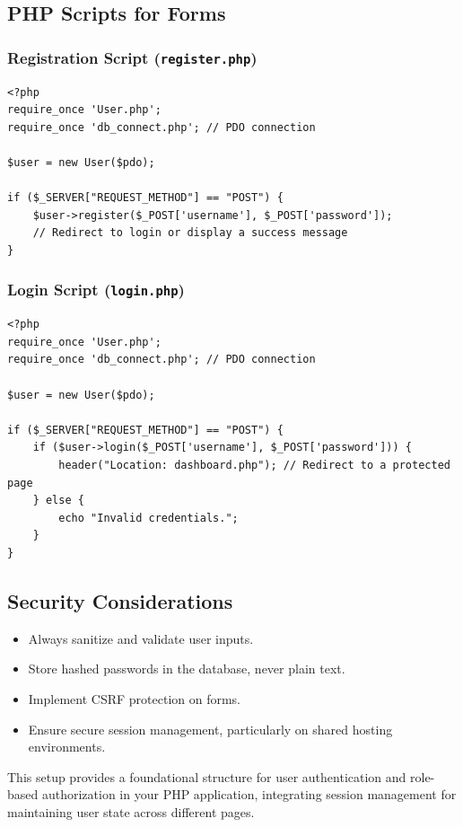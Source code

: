 \documentclass[11pt]{article}
\begin{document}
\subsection*{PHP Scripts for Forms}
\label{sec:org9ef2a00}
\subsubsection*{Registration Script (\texttt{register.php})}
\label{sec:org8a84ccd}
\begin{verbatim}
<?php
require_once 'User.php';
require_once 'db_connect.php'; // PDO connection

$user = new User($pdo);

if ($_SERVER["REQUEST_METHOD"] == "POST") {
    $user->register($_POST['username'], $_POST['password']);
    // Redirect to login or display a success message
}
\end{verbatim}

\subsubsection*{Login Script (\texttt{login.php})}
\label{sec:orgf70c0b3}
\begin{verbatim}
<?php
require_once 'User.php';
require_once 'db_connect.php'; // PDO connection

$user = new User($pdo);

if ($_SERVER["REQUEST_METHOD"] == "POST") {
    if ($user->login($_POST['username'], $_POST['password'])) {
        header("Location: dashboard.php"); // Redirect to a protected page
    } else {
        echo "Invalid credentials.";
    }
}
\end{verbatim}

\subsection*{Security Considerations}
\label{sec:org123a5a1}
\begin{itemize}
\item Always sanitize and validate user inputs.
\item Store hashed passwords in the database, never plain text.
\item Implement CSRF protection on forms.
\item Ensure secure session management, particularly on shared hosting
environments.
\end{itemize}

This setup provides a foundational structure for user authentication and
role-based authorization in your PHP application, integrating session
management for maintaining user state across different pages.
\end{document}
